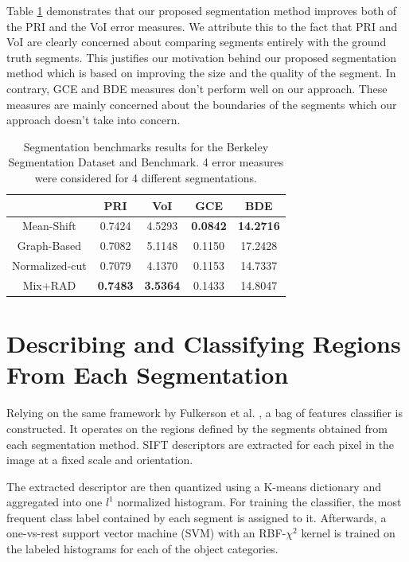\documentclass[10pt,twocolumn,letterpaper]{article}
\begin{document}
Table \ref{tab:seg_bench} demonstrates that our proposed segmentation method improves both of the PRI and the VoI error measures.
We attribute this to the fact that  PRI and VoI are clearly concerned about comparing segments entirely with the ground truth segments.
This justifies our motivation behind our proposed segmentation method which is based on improving the size and the quality of the segment.
In contrary, GCE and BDE measures don't perform well on our approach.
These measures are mainly concerned about the boundaries of the segments which our approach doesn't take into concern.

\begin{table}
\centering
\begin{tabular}
{|c||c|c|c|c|}
\hline
               & PRI             & VoI             & GCE             & BDE              \\\hline
Mean-Shift     & 0.7424          & 4.5293          & \textbf{0.0842} & \textbf{14.2716} \\\hline
Graph-Based    & 0.7082          & 5.1148          & 0.1150          & 17.2428          \\\hline
Normalized-cut & 0.7079          & 4.1370          & 0.1153          & 14.7337          \\\hline
Mix+RAD        & \textbf{0.7483} & \textbf{3.5364} & 0.1433          & 14.8047          \\\hline
\end{tabular}
\caption{Segmentation benchmarks results for the Berkeley Segmentation Dataset and
Benchmark. 4 error measures were considered for 4 different segmentations.}\label{tab:seg_bench}
\end{table}

\section{Describing and Classifying Regions From Each Segmentation}\label{ClassifySegs}

Relying on the same framework by Fulkerson et al. \cite{fulkerson09class}, a bag of features
classifier is constructed. It operates on the regions defined by
the segments obtained from each segmentation method. SIFT descriptors are extracted
for each pixel in the image at a fixed scale and orientation.

The extracted descriptor are then quantized using a K-means dictionary and aggregated
into one $l^1$ normalized histogram. For training the classifier, the most frequent class label
contained by each segment is assigned to it. Afterwards,  a one-vs-rest support vector  machine
(SVM) with an RBF-$\chi^2$ kernel is trained on the labeled histograms for each of the object
categories.
\end{document}
